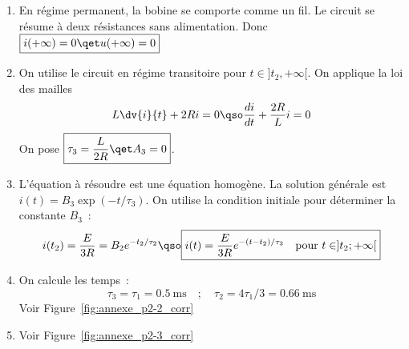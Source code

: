 \documentclass[a4paper, 10pt, garamond, oneside]{book}
\begin{document}
{\begin{enumerate}[resume]
\begin{minipage}[t]{.49\linewidth}
\[			      \]
          \end{minipage}
		      \hfill
		      \begin{minipage}[t]{.49\linewidth}
			      ~
			      \begin{center}
				      {transRL_corr5.pdf_tex}
			      \end{center}
		      \end{minipage}
		\item En régime permanent, la bobine se comporte comme un fil. Le circuit
          se résume à deux résistances sans alimentation. Donc
          $\boxed{i(+\infty)=0\qet u(+\infty)=0}$
		\item On utilise le circuit en régime transitoire pour $t\in]t_2,+\infty[$.
          On applique la loi des mailles
		      \[
			      L\dv{i}{t}+2Ri=0\qso \frac{di}{dt}+\frac{2R}{L}i=0
		      \]
		      On pose $\boxed{\tau_3=\frac{L}{2R}\qet A_3=0}$.
		\item L'équation à résoudre est une équation homogène. La solution générale
          est $i(t)=B_3\exp(-t/\tau_3)$.
          \smallbreak
		      On utilise la condition initiale pour déterminer la constante $B_3$~:
		      \[
			      i(t_2)=\frac{E}{3R}=B_2e^{-t_2/\tau_2}\qso
			      \boxed{
			      i(t)= \frac{E}{3R}e^{-(t-t_2)/\tau_3}
			      \quad\mbox{pour } t\in]t_2;+\infty[
			      }
		      \]
		\item On calcule les temps~:
		      \[
			      \tau_3=\tau_1=\SI{0,5}{\milli\second}
			      \quad ;\quad
			      \tau_2=4\tau_1/3=\SI{0,66}{\milli\second}
		      \]
		      Voir Figure~\ref{fig:annexe_p2-2_corr}
		\item Voir Figure~\ref{fig:annexe_p2-3_corr}
	\end{enumerate}
}
\end{document}
